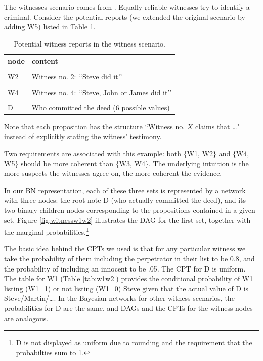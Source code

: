 \documentclass[10pt,]{scrartcl}
\newcommand{\s}[1]{\mbox{\textsf{#1}}}
\begin{document}
The witnesses scenario  comes from \citep[391]{olsson2005}. Equally reliable witnesses try to identify a criminal. Consider the
 potential reports (we extended the original scenario by adding \s{W5}) listed in Table \ref{tab:witRep}. 

\begin{table}[H]
\centering
\begin{tabular}{ll}
\toprule
node & content\\
\midrule
\cellcolor{gray!6}{W1} & \cellcolor{gray!6}{Witness no. 1: ‘‘Steve did it’’}\\
W2 & Witness no. 2: ‘‘Steve did it’’\\
\cellcolor{gray!6}{W3} & \cellcolor{gray!6}{Witness no. 3: ‘‘Steve, Martin or David did it’’}\\
W4 & Witness no. 4: ‘‘Steve, John or James did it’’\\
\cellcolor{gray!6}{W5} & \cellcolor{gray!6}{Wittness no. 5: ‘‘Steve, John or Peter did it’’}\\
D & Who committed the deed (6  possible values)\\
\bottomrule
\end{tabular}
\caption{Potential witness reports in the witness scenario.}
\label{tab:witRep}
\end{table}

\noindent Note that  each proposition has the structure ``Witness no.
\(X\) claims that \dots" instead of explicitly stating the witness'
testimony.

Two requirements are associated with this example: both
\(\{\)\textsf{W1, W2}\(\}\) and \(\{\)\textsf{W4, W5}\(\}\) should be
more coherent than \(\{\)\textsf{W3, W4}\(\}\).  The underlying intuition is the more suspects the witnesses agree on, the more coherent the evidence. 


In our BN representation, each of these three sets is represented by a network with three nodes: the root note \textsf{D} (who actually committed the deed), and its two binary children nodes corresponding to the propositions contained in a given set. Figure \ref{fig:witnessw1w2} illustrates the DAG for the first set, together with the marginal probabilities.\footnote{\textsf{D} is  not displayed as uniform due to rounding and the requirement that the probabilties sum to 1.}

The basic idea behind
the CPTs we used is that for any particular witness we take the
probability of them including the perpetrator in their list to be 0.8,
and the probability of including an innocent to be .05.  
The CPT for \textsf{D} is uniform. The table for \textsf{W1}  (Table \ref{tab:w1w2}) provides
the conditional probability of \textsf{W1} listing (\textsf{W1}=1) or
not listing (\textsf{W1}=0) Steve given that the actual
value of \textsf{D} is Steve/Martin/\dots.  In the
Bayesian networks for other witness scenarios, the probabilities for \textsf{D} are the same, and DAGs and  the CPTs for the witness nodes are analogous. 
\end{document}
